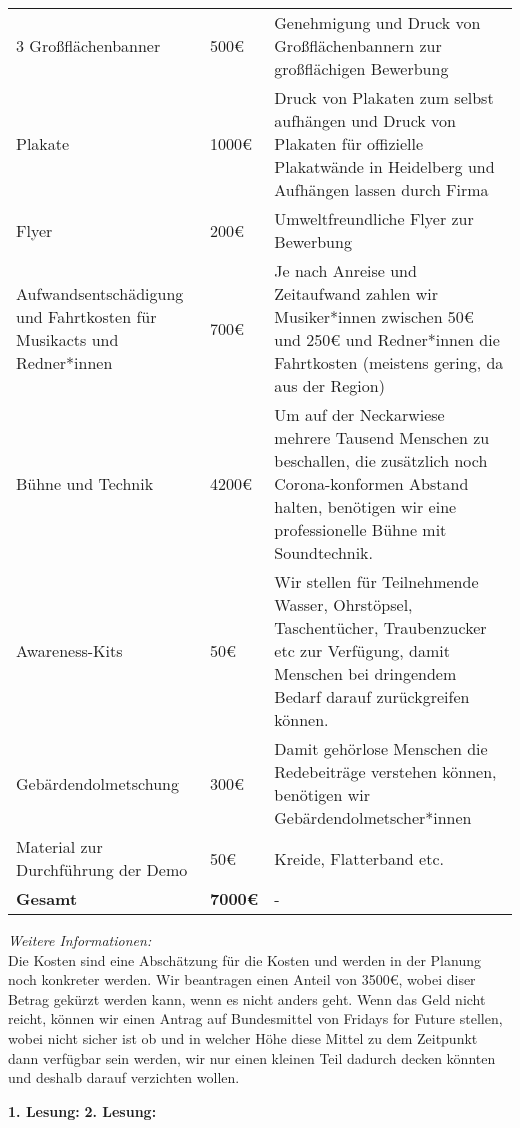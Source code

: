 {\begin{longtable}{p{3cm} p{1cm} p{11cm}}
        3 Großflächenbanner & 500€ & Genehmigung und Druck von Großflächenbannern zur großflächigen Bewerbung\\
        Plakate & 1000€ & Druck von Plakaten zum selbst aufhängen und Druck von Plakaten für offizielle Plakatwände in Heidelberg und Aufhängen lassen durch Firma\\
        Flyer & 200€ & Umweltfreundliche Flyer zur Bewerbung\\
        Aufwandsentschädigung und Fahrtkosten für Musikacts und Redner*innen & 700€ & Je nach Anreise und Zeitaufwand zahlen wir Musiker*innen zwischen 50€ und 250€ und Redner*innen die Fahrtkosten (meistens gering, da aus der Region)\\
        Bühne und Technik & 4200€ & Um auf der Neckarwiese mehrere Tausend Menschen zu beschallen, die zusätzlich noch Corona-konformen Abstand halten, benötigen wir eine professionelle Bühne mit Soundtechnik.\\
        Awareness-Kits & 50€ & Wir stellen für Teilnehmende Wasser, Ohrstöpsel, Taschentücher, Traubenzucker etc zur Verfügung, damit Menschen bei dringendem Bedarf darauf zurückgreifen können.\\
        Gebärdendolmetschung & 300€ & Damit gehörlose Menschen die Redebeiträge verstehen können, benötigen wir Gebärdendolmetscher*innen\\
        Material zur Durchführung der Demo & 50€ & Kreide, Flatterband etc.\\
        \textbf{Gesamt} & \textbf{7000€} & - \\  
    \end{longtable}    \emph{Weitere Informationen:}\\
    Die Kosten sind eine Abschätzung für die Kosten und werden in der Planung noch konkreter werden. Wir beantragen einen Anteil von 3500€, wobei diser Betrag gekürzt werden kann, wenn es nicht anders geht. Wenn das Geld nicht reicht, können wir einen Antrag auf Bundesmittel von Fridays for Future stellen, wobei nicht sicher ist ob und in welcher Höhe diese Mittel zu dem Zeitpunkt dann verfügbar sein werden, wir nur einen kleinen Teil dadurch decken könnten und deshalb darauf verzichten wollen.
}{
    \textbf{1. Lesung:}
    \ul{
    }
    \textbf{2. Lesung:}
    \ul{
    }
}
